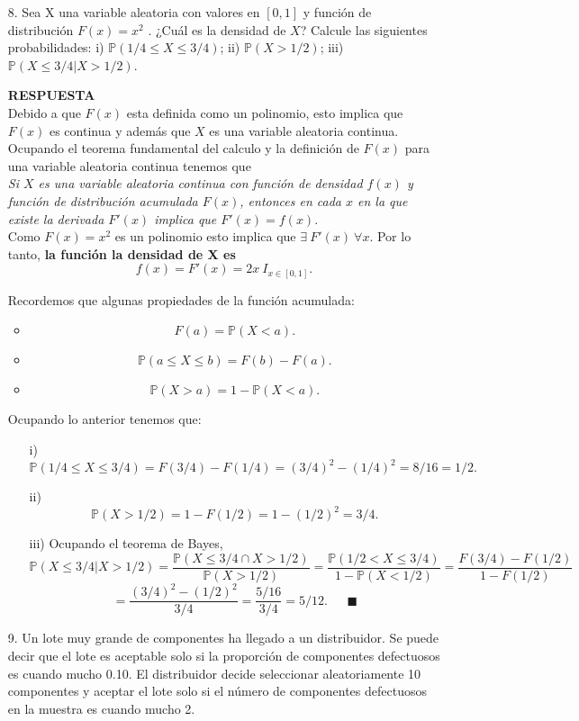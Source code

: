 \documentclass[11pt,letterpaper]{article}
\newcommand{\mP}{\mathbb{P}}
\newcommand{\res}{\textbf{RESPUESTA}\\}
\begin{document}
\begin{itemize}
\item[8.] Sea X una variable aleatoria con valores en $[0, 1]$ y función de distribución $F(x)=x^2$ . ¿Cuál es
la densidad de $X$? Calcule las siguientes probabilidades: i) $\mP (1/4 \leq X \leq 3/4)$; ii) $\mP (X > 1/2)$;
iii) $\mP (X \leq 3/4|X > 1/2)$.

\res
Debido a que $F(x)$ esta definida como un polinomio, esto implica que $F(x)$ es continua y además que $X$ es una variable aleatoria continua. Ocupando el teorema fundamental del calculo y la definición de $F(x)$ para una variable aleatoria continua tenemos que\\ 

\textit{Si $X$ es una variable aleatoria continua con función de densidad $f(x)$ y función de distribución acumulada $F(x)$, entonces en cada $x$ en la que existe la derivada $F'(x)$ implica que $F'(x)=f(x).$}\\

Como $F(x)=x^2$ es un polinomio esto implica que $\exists\ F'(x) \ \forall x$. Por lo tanto, \textbf{la función la densidad de X es}
$$f(x)=F'(x)=2x \ I_{x\in [0,1]}.$$

Recordemos que algunas propiedades de la función acumulada:
\begin{itemize}
\item $$F(a)=\mP(X<a).$$
\item $$\mP (a\leq X\leq b)= F(b)-F(a). $$
\item $$\mP(X>a)=1-\mP(X<a).$$
\end{itemize}
Ocupando lo anterior tenemos que:
\begin{itemize}
\item[i)] 
$$\mP (1/4 \leq X \leq 3/4)= F(3/4)-F(1/4)= (3/4)^2-(1/4)^2=8/16=1/2.$$ 
\item[ii)]$$\mP(X > 1/2)= 1-F(1/2)=1-(1/2)^2=3/4.$$
\item[iii)]Ocupando el teorema de Bayes,
$$\mP(X \leq 3/4|X > 1/2)=\frac{\mP(X\leq 3/4 \cap X>1/2)}{\mP(X>1/2)}=\frac{\mP(1/2<X\leq3/4)}{1-\mP(X<1/2)}=\frac{F(3/4)-F(1/2)}{1-F(1/2)}$$
$$=\frac{(3/4)^2-(1/2)^2}{3/4} =\frac{5/16}{3/4}=5/12. \ \ \ \ \ \ \  \blacksquare$$
\end{itemize}

\item[9.] Un lote muy grande de componentes ha llegado a un distribuidor. Se puede decir que el
lote es aceptable solo si la proporción de componentes defectuosos es cuando mucho 0.10.
El distribuidor decide seleccionar aleatoriamente 10 componentes y aceptar el lote solo si el
número de componentes defectuosos en la muestra es cuando mucho 2.


\end{itemize}
\end{document}

